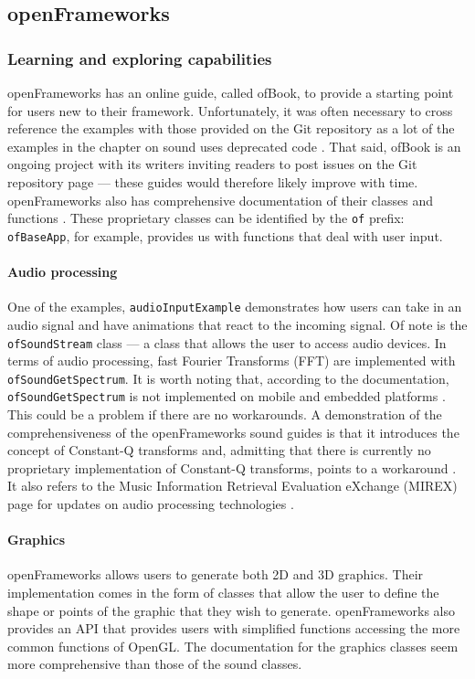 \documentclass[../../initial_thesis.tex]{subfiles}
\begin{document}
\subsection{openFrameworks}\label{sec:openframeworks}

\subsubsection{Learning and exploring capabilities}
openFrameworks has an online guide, called ofBook, to provide a starting point for users new to their framework. Unfortunately, it was often necessary to cross reference the examples with those provided on the Git repository as a lot of the examples in the chapter on sound uses deprecated code \cite{Carlucci}. That said, ofBook is an ongoing project with its writers inviting readers to post issues on the Git repository page --- these guides would therefore likely improve with time. openFrameworks also has comprehensive documentation of their classes and functions \cite{openFrameworks}. These proprietary classes can be identified by the \texttt{of} prefix: \texttt{ofBaseApp}, for example, provides us with functions that deal with user input.

\paragraph{Audio processing}
One of the examples, \texttt{audioInputExample} demonstrates how users can take in an audio signal and have animations that react to the incoming signal. Of note is the \texttt{ofSoundStream} class --- a class that allows the user to access audio devices. In terms of audio processing, fast Fourier Transforms (FFT) are implemented with \texttt{ofSoundGetSpectrum}. It is worth noting that, according to the documentation, \texttt{ofSoundGetSpectrum} is not implemented on mobile and embedded platforms \cite{OFsoundstreamFFT}. This could be a problem if there are no workarounds. A demonstration of the comprehensiveness of the openFrameworks sound guides is that it introduces the concept of Constant-Q transforms and, admitting that there is currently no proprietary implementation of Constant-Q transforms, points to a workaround \cite{Klapuri}. It also refers to the Music Information Retrieval Evaluation eXchange (MIREX) page for updates on audio processing technologies \cite{mirexWiki}.

\paragraph{Graphics}
openFrameworks allows users to generate both 2D and 3D graphics. Their implementation comes in the form of classes that allow the user to define the shape or points of the graphic that they wish to generate. openFrameworks also provides an API that provides users with simplified functions accessing the more common functions of OpenGL. The documentation for the graphics classes seem more comprehensive than those of the sound classes.
\end{document}
